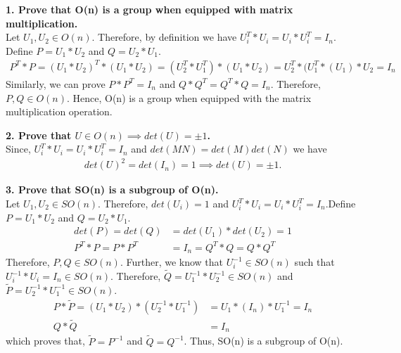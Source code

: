 \documentclass[11pt]{article}
\begin{document}



\textbf{1. Prove that O(n) is a group when equipped with matrix multiplication.}\\
Let $U_1,U_2 \in O(n)$. Therefore, by definition we have $U_i^T*U_i = U_i*U_i^T = I_n$. Define $P = U_1*U_2$ and $Q = U_2*U_1$. 
\begin{align*}
P^T*P = (U_1*U_2)^T*(U_1*U_2) = (U_2^T*U_1^T)*(U_1*U_2) = U_2^T*(U_1^T*(U_1)*U_2 = I_n
\end{align*}
Similarly, we can prove $P*P^T = I_n$ and $Q*Q^T = Q^T*Q = I_n$. Therefore, $P, Q \in O(n)$. Hence, O(n) is a group when equipped with the matrix multiplication operation.

\hrulefill

\textbf{2. Prove that $U \in O(n) \implies det(U) = \pm 1$.}\\
Since, $U_i^T*U_i = U_i*U_i^T = I_n$ and $det(MN) = det(M)det(N)$ we have 
\begin{align*}
det(U)^2 = det(I_n) = 1 \implies det(U) = \pm 1.
\end{align*}

\hrulefill

\textbf{3. Prove that SO(n) is a subgroup of O(n).}\\
Let $U_1, U_2 \in SO(n)$. Therefore, $det(U_i) = 1$ and $U_i^T*U_i = U_i*U_i^T = I_n$.Define $P = U_1*U_2$ and $Q = U_2*U_1$. \begin{align*}
det(P) = det(Q) &= det(U_1)*det(U_2) = 1\\
P^T*P = P*P^T &= I_n = Q^T*Q = Q*Q^T 
\end{align*}
Therefore, $P,Q \in SO(n)$.
Further, we know that $U_i^{-1} \in SO(n)$ such that $U_i^{-1}*U_i = I_n \in SO(n)$. Therefore, $\tilde{Q} =  U_1^{-1}*U_2^{-1} \in SO(n)$ and $\tilde{P} = U_2^{-1}*U_1^{-1} \in SO(n)$.
\begin{align*}
P*\tilde{P} =  (U_1*U_2)*(U_2^{-1}*U_1^{-1}) & = U_1*(I_n)*U_1^{-1} = I_n\\
Q*\tilde{Q} &= I_n
\end{align*} 
which proves that, $\tilde{P} = P^{-1}$ and $\tilde{Q} = Q^{-1}$. Thus, SO(n) is a subgroup of O(n).

\hrulefill
\end{document}

